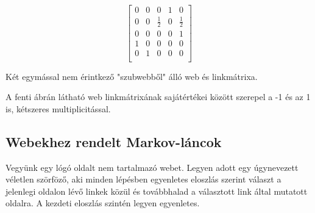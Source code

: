 \documentclass[12pt,a4paper]{article}
\begin{document}
\vspace{0.3cm}
\begin{minipage}{0.4\textwidth}
	\begin{center}
	\end{center}
\end{minipage}
\begin{minipage}{0.5\textwidth}
	\begin{center}
		\[
		\begin{bmatrix}
		0 & 0 & 0 & 1 & 0 \\
		0 & 0 & \frac{1}{2} & 0 & \frac{1}{2} \\
		0 & 0 & 0 & 0 & 1 \\
		1 & 0 & 0 & 0 & 0 \\
		0 & 1 & 0 & 0 & 0 \\
		\end{bmatrix}
		\]
	\end{center}
\end{minipage}
\vspace{0.3cm}
\newline
\centerline{Két egymással nem érintkező "szubwebből" álló web és linkmátrixa.}
\vspace{0.3cm}

A fenti ábrán látható web linkmátrixának sajátértékei között szerepel a -1 és az 1 is, kétszeres multiplicitással.

\subsection{Webekhez rendelt Markov-láncok}

Vegyünk egy lógó oldalt nem tartalmazó webet. Legyen adott egy úgynevezett véletlen szörföző, aki minden lépésben egyenletes eloszlás szerint választ a jelenlegi oldalon lévő linkek közül és továbbhalad a választott link által mutatott oldalra. A kezdeti eloszlás szintén legyen egyenletes.
\end{document}
